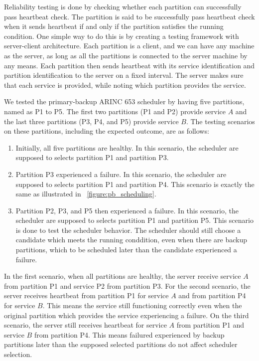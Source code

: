 \documentclass[conference]{IEEEtran}
\begin{document}
Reliability testing is done by checking whether each partition can successfully pass heartbeat
check. The partition is said to be successfully pass heartbeat check when it sends heartbeat if
and only if the partition satisfies the running condition. One simple way to do this is by
creating a testing framework with server-client architecture. Each partition is a client, and we
can have any machine as the server, as long as all the partitions is connected to the server
machine by any means. Each partition then sends heartbeat with its service identification and
partition identification to the server on a fixed interval. The server makes sure that each
service is provided, while noting which partition provides the service.

We tested the primary-backup ARINC 653 scheduler by having five partitions, named as P1 to P5.
The first two partitions (P1 and P2) provide service $A$ and the last three partitions (P3, P4,
and P5) provide service $B$. The testing scenarios on these partitions, including the expected
outcome, are as follows:

\begin{enumerate}
	\item Initially, all five partitions are healthy. In this scenario, the scheduler are
		supposed to selects partition P1 and partition P3.

	\item Partition P3 experienced a failure. In this scenario, the scheduler are supposed
		to selects partition P1 and partition P4. This scenario is exactly the same as
		illustrated in \figurename ~\ref{figure:pb_scheduling}.

	\item Partition P2, P3, and P5 then experienced a failure. In this scenario, the
		scheduler are supposed to selects partition P1 and partition P5. This scenario is
		done to test the scheduler behavior. The scheduler should still choose a
		candidate which meets the running conddition, even when there are backup
		partitions, which to be scheduled later than the candidate experienced a
		failure. 
\end{enumerate}

In the first scenario, when all partitions are healthy, the server receive service $A$ from
partition P1 and service P2 from partition P3. For the second scenario, the server receives
heartbeat from partition P1 for service $A$ and from partition P4 for service $B$. This means
the service still functioning correctly even when the original partition which provides the
service experiencing a failure. On the third scenario, the server still receives heartbeat for
service $A$ from partition P1 and service $B$ from partition P4. This means failured experienced
by backup partitions later than the supposed selected partitions do not affect scheduler
selection.
\end{document}
